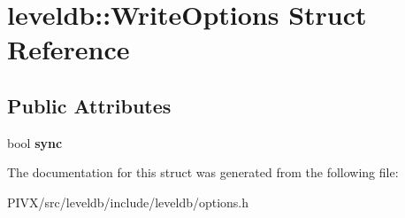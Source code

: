 \hypertarget{structleveldb_1_1_write_options}{}\section{leveldb\+:\+:Write\+Options Struct Reference}
\label{structleveldb_1_1_write_options}
\subsection*{Public Attributes}
\begin{DoxyCompactItemize}
\item 
\mbox{\label{structleveldb_1_1_write_options_a07cd165ae5ed59a763001286e14ba47e}} 
bool {\bfseries sync}
\end{DoxyCompactItemize}


The documentation for this struct was generated from the following file\+:\begin{DoxyCompactItemize}
\item 
P\+I\+V\+X/src/leveldb/include/leveldb/options.\+h\end{DoxyCompactItemize}
